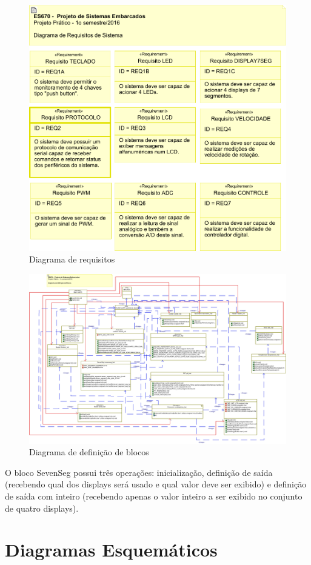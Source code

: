 \documentclass{article}
\begin{document}
\begin{figure}[H]
	\centering
	\includegraphics[width=0.9\linewidth]{requisitos}
	\caption{Diagrama de requisitos}
	\label{fig:requisitos}
\end{figure}
\begin{figure}[H]
	\centering
	\includegraphics[width=0.9\linewidth]{blocos}
	\caption{Diagrama de definição de blocos}
	\label{fig:blocos}
\end{figure}
O bloco SevenSeg possui três operações: inicialização, definição de saída (recebendo qual dos displays será usado e qual valor deve ser exibido) e definição de saída com inteiro (recebendo apenas o valor inteiro a ser exibido no conjunto de quatro displays).

\section{Diagramas Esquemáticos}
\end{document}
